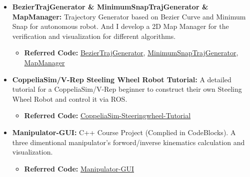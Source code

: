 \documentclass[11pt,a4paper,sans]{moderncv}        %
\begin{document}
{\begin{itemize}
\begin{itemize}
\item \textbf{Referred Code:} \href{https://github.com/jianhengLiu/quad_controller_SE3}{quad-controller-SE3}, \href{https://github.com/jianhengLiu/FlightController}{FlightController}

\item \textbf{Referred Video:} \href{https://www.bilibili.com/video/BV1xv411w7Md?share_source=copy_web}{Bilibili-1}, \href{https://www.bilibili.com/video/BV1rq4y1N76T?share_source=copy_web}{Bilibili-2}
\end{itemize}

\vspace{6pt}

\item \textbf{BezierTrajGenerator \& MinimumSnapTrajGenerator \& 
MapManager:} Trajectory Generator based on Bezier Curve and Minimum Snap for autonomous robot. And I develop a 2D Map Manager for the verification and visualization for different algorithms.

\begin{itemize}
\item \textbf{Referred Code:} \href{https://github.com/jianhengLiu/BezierTrajGenerator}{BezierTrajGenerator}, \href{https://github.com/jianhengLiu/MinimumSnapTrajGenerator}{MinimumSnapTrajGenerator}, \href{https://github.com/jianhengLiu/MapManager}{MapManager}
\end{itemize}

\vspace{6pt}

\item \textbf{CoppeliaSim/V-Rep Steeling Wheel Robot Tutorial:} A detailed tutorial for a CoppeliaSim/V-Rep beginner to construct their own Steeling Wheel Robot and control it via ROS.

\begin{itemize}
\item \textbf{Referred Code:} \href{https://github.com/jianhengLiu/CoppeliaSim_Steeringwheel_Tutorial}{CoppeliaSim-Steeringwheel-Tutorial}
\end{itemize}
\vspace{6pt}

\item \textbf{Manipulator-GUI:} C++ Course Project (Complied in CodeBlocks). A three dimentional manipulator's forword/inverse kinematics calculation and visualization.

\begin{itemize}
\item \textbf{Referred Code:} \href{https://github.com/jianhengLiu/Manipulator_GUI}{Manipulator-GUI}
\end{itemize}


\end{itemize}}
\end{document}
